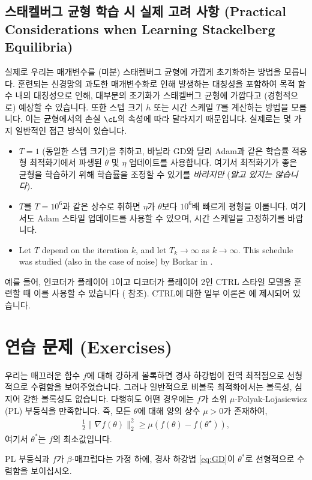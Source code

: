 \documentclass[../../book-main_ko.tex]{subfiles}
\begin{document}
\subsection{스태켈버그 균형 학습 시 실제 고려 사항 (Practical Considerations when Learning Stackelberg Equilibria)}

실제로 우리는 매개변수를 (미분) 스태켈버그 균형에 가깝게 초기화하는 방법을 모릅니다. 훈련되는 신경망의 과도한 매개변수화로 인해 발생하는 대칭성을 포함하여 목적 함수 내의 대칭성으로 인해, 대부분의 초기화가 스태켈버그 균형에 가깝다고 (경험적으로) 예상할 수 있습니다. 또한 스텝 크기 \(h\) 또는 시간 스케일 \(T\)를 계산하는 방법을 모릅니다. 이는 균형에서의 손실 \(\cL\)의 속성에 따라 달라지기 때문입니다. 실제로는 몇 가지 일반적인 접근 방식이 있습니다.
\begin{itemize}
    \item \(T = 1\) (동일한 스텝 크기)을 취하고, 바닐라 GD와 달리 Adam과 같은 학습률 적응형 최적화기에서 파생된 \(\theta\) 및 \(\eta\) 업데이트를 사용합니다. 여기서 최적화기가 좋은 균형을 학습하기 위해 학습률을 조정할 수 있기를 \textit{바라지만} (\textit{알고 있지는 않습니다}).
    \item \(T\)를 \(T = 10^{6}\)과 같은 상수로 취하면 \(\eta\)가 \(\theta\)보다 \(10^{6}\)배 빠르게 평형을 이룹니다. 여기서도 Adam 스타일 업데이트를 사용할 수 있으며, 시간 스케일을 고정하기를 바랍니다.
    \item Let \(T\) depend on the iteration \(k\), and let \(T_{k} \to \infty\) as \(k \to \infty\). This schedule was studied (also in the case of noise) by Borkar in \cite{borkar1997stochastic}.
\end{itemize}
예를 들어, 인코더가 플레이어 1이고 디코더가 플레이어 2인 CTRL 스타일 모델을 훈련할 때 이를 사용할 수 있습니다 ( 참조). CTRL에 대한 일부 이론은 에 제시되어 있습니다.

\section{연습 문제 (Exercises)}

\begin{exercise}
    우리는 매끄러운 함수 \(f\)에 대해 강하게 볼록하면 경사 하강법이 전역 최적점으로 선형적으로 수렴함을 보여주었습니다. 그러나 일반적으로 비볼록 최적화에서는 볼록성, 심지어 강한 볼록성도 없습니다. 다행히도 어떤 경우에는 \(f\)가 소위 \(\mu\)-Polyak-Lojasiewicz (PL) 부등식을 만족합니다. 즉, 모든 \(\theta\)에 대해 양의 상수 \(\mu > 0\)가 존재하여,
    \begin{align*}
        \frac{1}{2}\|\nabla f(\theta)\|_2^2 \ge \mu\left( f(\theta) - f(\theta^\star) \right),
    \end{align*}
    여기서 \(\theta^*\)는 \(f\)의 최소값입니다.
    
    PL 부등식과 \(f\)가 \(\beta\)-매끄럽다는 가정 하에, 경사 하강법 \eqref{eq:GD}이 \(\theta^*\)로 선형적으로 수렴함을 보이십시오.
\end{exercise}
\end{document}

